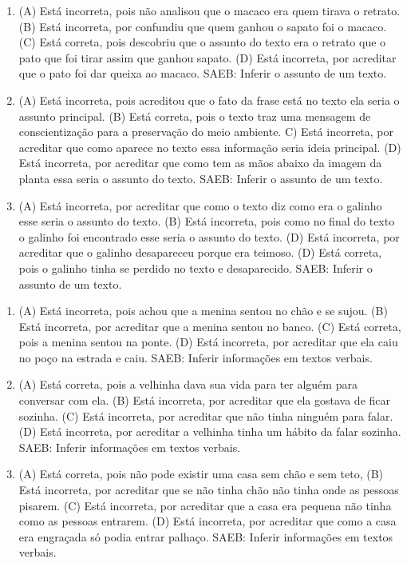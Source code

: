 \begin{enumerate}
\item
(A) Está incorreta, pois não analisou que o macaco era quem tirava o retrato.
(B) Está incorreta, por confundiu que quem ganhou o sapato foi o macaco.
(C) Está correta, pois descobriu que o assunto do texto era o retrato
que o pato que foi tirar assim que ganhou sapato.
(D) Está incorreta, por acreditar que o pato foi dar queixa ao macaco.
SAEB: Inferir o assunto de um texto.

\item
(A) Está incorreta, pois acreditou que o fato da frase está no texto ela
seria o assunto principal.
(B) Está correta, pois o texto traz uma mensagem de conscientização para
a preservação do meio ambiente.
C) Está incorreta, por acreditar que como aparece no texto essa
informação seria ideia principal.
(D) Está incorreta, por acreditar que como tem as mãos abaixo da imagem
da planta essa seria o assunto do texto.
SAEB: Inferir o assunto de um texto.

\item
(A) Está incorreta, por acreditar que como o texto diz como era o
galinho esse seria o assunto do texto.
(B) Está incorreta, pois como no final do texto o galinho foi encontrado
esse seria o assunto do texto.
(D) Está incorreta, por acreditar que o galinho desapareceu porque era
teimoso.
(D) Está correta, pois o galinho tinha se perdido no texto e
desaparecido.
SAEB: Inferir o assunto de um texto.
\end{enumerate}


\begin{enumerate}
\item
(A) Está incorreta, pois achou que a menina sentou no chão e se sujou.
(B) Está incorreta, por acreditar que a menina sentou no banco.
(C) Está correta, pois a menina sentou na ponte.
(D) Está incorreta, por acreditar que ela caiu no poço na estrada e caiu.
SAEB: Inferir informações em textos verbais.

\item
(A) Está correta, pois a velhinha dava sua vida para ter alguém para conversar com ela.
(B) Está incorreta, por acreditar que ela gostava de ficar sozinha.
(C) Está incorreta, por acreditar que não tinha ninguém para falar.
(D) Está incorreta, por acreditar a velhinha tinha um hábito da falar sozinha.
SAEB: Inferir informações em textos verbais.

\item
(A) Está correta, pois não pode existir uma casa sem chão e sem teto,
(B) Está incorreta, por acreditar que se não tinha chão não tinha onde
as pessoas pisarem.
(C) Está incorreta, por acreditar que a casa era pequena não tinha como
as pessoas entrarem.
(D) Está incorreta, por acreditar que como a casa era engraçada só podia
entrar palhaço.
SAEB: Inferir informações em textos verbais.
\end{enumerate}

